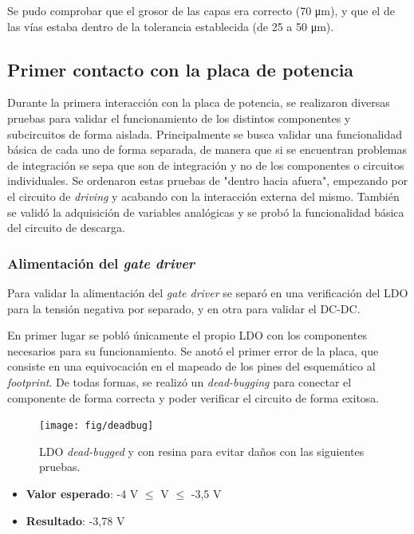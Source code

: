 Se pudo comprobar que el grosor de las capas era correcto (70 \unit{\micro\meter}), y que el de las vías estaba dentro de la tolerancia establecida (de 25 a 50 \unit{\micro\meter}).

\subsection{Primer contacto con la placa de potencia}

Durante la primera interacción con la placa de potencia, se realizaron diversas pruebas para validar el funcionamiento de los distintos componentes y subcircuitos de forma aislada. Principalmente se busca validar una funcionalidad básica de cada uno de forma separada, de manera que si se encuentran problemas de integración se sepa que son de integración y no de los componentes o circuitos individuales. Se ordenaron estas pruebas de "dentro hacia afuera", empezando por el circuito de \textit{driving} y acabando con la interacción externa del mismo. También se validó la adquisición de variables analógicas y se probó la funcionalidad básica del circuito de descarga.


\subsubsection{Alimentación del \textit{gate driver}}

Para validar la alimentación del \textit{gate driver} se separó en una verificación del LDO para la tensión negativa por separado, y en otra para validar el DC-DC.

En primer lugar se pobló únicamente el propio LDO con los componentes necesarios para su funcionamiento. Se anotó el primer error de la placa, que consiste en una equivocación en el mapeado de los pines del esquemático al \textit{footprint}. De todas formas, se realizó un \textit{dead-bugging} para conectar el componente de forma correcta y poder verificar el circuito de forma exitosa.

\begin{figure}[H]
	\centering
	\texttt{[image: fig/deadbug]}
	\caption{LDO \textit{dead-bugged} y con resina para evitar daños con las siguientes pruebas.}
\end{figure}

\begin{itemize}
	\item \textbf{Valor esperado}: -4 V $\le$ V $\le$ -3,5 V
	\item \textbf{Resultado}: -3,78 V
\end{itemize}


